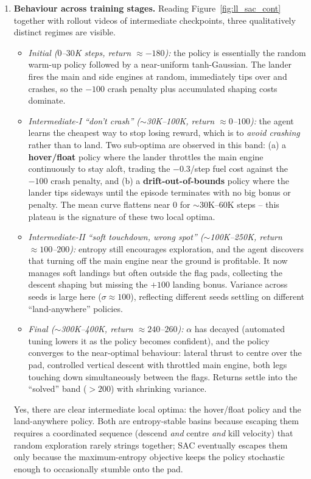 \documentclass[12pt]{scrartcl}
\begin{document}
\begin{enumerate}
    \item \textbf{Behaviour across training stages.} Reading Figure~\ref{fig:ll_sac_cont} together with rollout videos of intermediate checkpoints, three qualitatively distinct regimes are visible.
    \begin{itemize}
        \item \emph{Initial ($0$--$30$K steps, return $\approx -180$):} the policy is essentially the random warm-up policy followed by a near-uniform tanh-Gaussian. The lander fires the main and side engines at random, immediately tips over and crashes, so the $-100$ crash penalty plus accumulated shaping costs dominate.
        \item \emph{Intermediate-I ``don't crash'' ($\sim$30K--100K, return $\approx 0$--$100$):} the agent learns the cheapest way to stop losing reward, which is to \emph{avoid crashing} rather than to land. Two sub-optima are observed in this band: (a) a \textbf{hover/float} policy where the lander throttles the main engine continuously to stay aloft, trading the $-0.3$/step fuel cost against the $-100$ crash penalty, and (b) a \textbf{drift-out-of-bounds} policy where the lander tips sideways until the episode terminates with no big bonus or penalty. The mean curve flattens near $0$ for $\sim$30K--60K steps -- this plateau is the signature of these two local optima.
        \item \emph{Intermediate-II ``soft touchdown, wrong spot'' ($\sim$100K--250K, return $\approx 100$--$200$):} entropy still encourages exploration, and the agent discovers that turning off the main engine near the ground is profitable. It now manages soft landings but often outside the flag pads, collecting the descent shaping but missing the $+100$ landing bonus. Variance across seeds is large here ($\sigma\approx 100$), reflecting different seeds settling on different ``land-anywhere'' policies.
        \item \emph{Final ($\sim$300K--400K, return $\approx 240$--$260$):} $\alpha$ has decayed (automated tuning lowers it as the policy becomes confident), and the policy converges to the near-optimal behaviour: lateral thrust to centre over the pad, controlled vertical descent with throttled main engine, both legs touching down simultaneously between the flags. Returns settle into the ``solved'' band ($>200$) with shrinking variance.
    \end{itemize}
    Yes, there are clear intermediate local optima: the hover/float policy and the land-anywhere policy. Both are entropy-stable basins because escaping them requires a coordinated sequence (descend \emph{and} centre \emph{and} kill velocity) that random exploration rarely strings together; SAC eventually escapes them only because the maximum-entropy objective keeps the policy stochastic enough to occasionally stumble onto the pad.


\end{enumerate}
\end{document}
